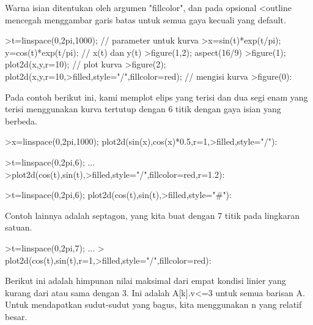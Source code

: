 \documentclass{article}
\begin{document}
\begin{eulernotebook}
\begin{eulercomment}
\begin{eulercomment}
\begin{eulercomment}
\begin{eulercomment}
\begin{eulercomment}
\begin{eulercomment}
\begin{eulercomment}
\begin{eulercomment}
\begin{eulercomment}
Warna isian ditentukan oleh argumen "fillcolor", dan pada opsional
\textless{}outline mencegah menggambar garis batas untuk semua gaya kecuali yang
default.
\end{eulercomment}
\begin{eulerprompt}
>t=linspace(0,2pi,1000); // parameter untuk kurva
>x=sin(t)*exp(t/pi); y=cos(t)*exp(t/pi); // x(t) dan y(t)
>figure(1,2); aspect(16/9)
>figure(1); plot2d(x,y,r=10); // plot kurva
>figure(2); plot2d(x,y,r=10,>filled,style="/",fillcolor=red); // mengisi kurva
>figure(0):
\end{eulerprompt}
\begin{eulercomment}
Pada contoh berikut ini, kami memplot elips yang terisi dan dua segi
enam yang terisi menggunakan kurva tertutup dengan 6 titik dengan gaya
isian yang berbeda.
\end{eulercomment}
\begin{eulerprompt}
>x=linspace(0,2pi,1000); plot2d(sin(x),cos(x)*0.5,r=1,>filled,style="/"):
\end{eulerprompt}
\begin{eulerprompt}
>t=linspace(0,2pi,6); ...
>plot2d(cos(t),sin(t),>filled,style="/",fillcolor=red,r=1.2):
\end{eulerprompt}
\begin{eulerprompt}
>t=linspace(0,2pi,6); plot2d(cos(t),sin(t),>filled,style="#"):
\end{eulerprompt}
\begin{eulercomment}
Contoh lainnya adalah septagon, yang kita buat dengan 7 titik pada
lingkaran satuan.
\end{eulercomment}
\begin{eulerprompt}
>t=linspace(0,2pi,7);  ...
> plot2d(cos(t),sin(t),r=1,>filled,style="/",fillcolor=red):
\end{eulerprompt}
\begin{eulercomment}
Berikut ini adalah himpunan nilai maksimal dari empat kondisi linier
yang kurang dari atau sama dengan 3. Ini adalah A[k].v\textless{}=3 untuk semua
barisan A. Untuk mendapatkan sudut-sudut yang bagus, kita menggunakan
n yang relatif besar.
\end{eulercomment}

\end{eulercomment}
\end{eulercomment}
\end{eulercomment}
\end{eulercomment}
\end{eulercomment}
\end{eulercomment}
\end{eulercomment}
\end{eulercomment}
\end{eulernotebook}
\end{document}
